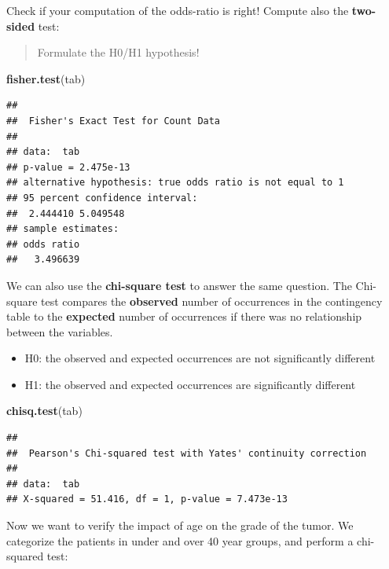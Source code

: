 \documentclass[
]{book}
\newenvironment{Shaded}{\begin{snugshade}}{\end{snugshade}}
\newcommand{\CommentTok}[1]{\textcolor[rgb]{0.56,0.35,0.01}{\textit{#1}}}
\newcommand{\DecValTok}[1]{\textcolor[rgb]{0.00,0.00,0.81}{#1}}
\newcommand{\DocumentationTok}[1]{\textcolor[rgb]{0.56,0.35,0.01}{\textbf{\textit{#1}}}}
\newcommand{\FunctionTok}[1]{\textcolor[rgb]{0.13,0.29,0.53}{\textbf{#1}}}
\newcommand{\NormalTok}[1]{#1}
\newcommand{\OtherTok}[1]{\textcolor[rgb]{0.56,0.35,0.01}{#1}}
\newcommand{\SpecialCharTok}[1]{\textcolor[rgb]{0.81,0.36,0.00}{\textbf{#1}}}
\providecommand{\tightlist}{%
  \setlength{\itemsep}{0pt}\setlength{\parskip}{0pt}}
\begin{document}
Check if your computation of the odds-ratio is right!
Compute also the \textbf{two-sided} test:

\begin{quote}
Formulate the H0/H1 hypothesis!
\end{quote}

\begin{Shaded}
\begin{Highlighting}[]
\FunctionTok{fisher.test}\NormalTok{(tab)}
\end{Highlighting}
\end{Shaded}

\begin{verbatim}
## 
##  Fisher's Exact Test for Count Data
## 
## data:  tab
## p-value = 2.475e-13
## alternative hypothesis: true odds ratio is not equal to 1
## 95 percent confidence interval:
##  2.444410 5.049548
## sample estimates:
## odds ratio 
##   3.496639
\end{verbatim}

We can also use the \textbf{chi-square test} to answer the same question.
The Chi-square test compares the \textbf{observed} number of occurrences in the contingency table to the \textbf{expected} number of occurrences if there was no relationship between the variables.

\begin{itemize}
\tightlist
\item
  H0: the observed and expected occurrences are not significantly different
\item
  H1: the observed and expected occurrences are significantly different
\end{itemize}

\begin{Shaded}
\begin{Highlighting}[]
\FunctionTok{chisq.test}\NormalTok{(tab)}
\end{Highlighting}
\end{Shaded}

\begin{verbatim}
## 
##  Pearson's Chi-squared test with Yates' continuity correction
## 
## data:  tab
## X-squared = 51.416, df = 1, p-value = 7.473e-13
\end{verbatim}

Now we want to verify the impact of age on the grade of the tumor.
We categorize the patients in under and over 40 year groups, and perform a chi-squared test:

\begin{Shaded}
\end{Shaded}
\end{document}
